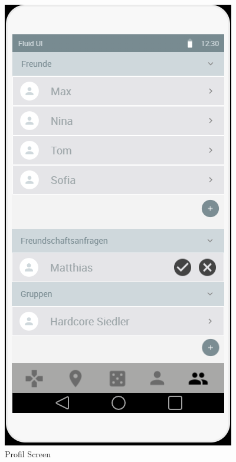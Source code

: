 \begin{figure}[H]
  \hfill
  \begin{minipage}[b]{0.4\textwidth}
    \includegraphics[width=\textwidth]{images/FreundundGruppenScreen.PNG}
    \caption{Profil Screen}
    \label{fig:SocialScreen}
  \end{minipage}
\end{figure}


